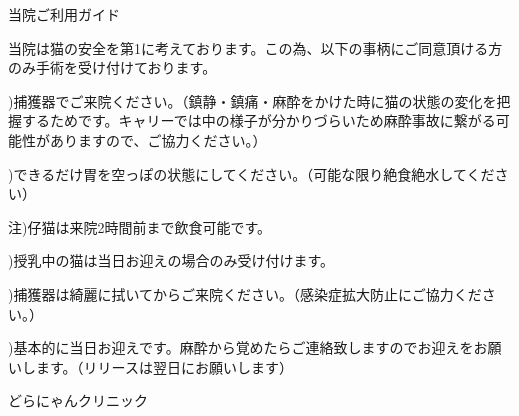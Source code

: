 \documentclass[b5paper]{jsarticle}
\begin{document}
\Huge

当院ご利用ガイド\vspace{10pt}

\Large

当院は猫の安全を第1に考えております。この為、以下の事柄にご同意頂ける方のみ手術を受け付けております。\vspace{20pt}


)捕獲器でご来院ください。（鎮静・鎮痛・麻酔をかけた時に猫の状態の変化を把握するためです。キャリーでは中の様子が分かりづらいため麻酔事故に繋がる可能性がありますので、ご協力ください。）\vspace{5pt}


)できるだけ胃を空っぽの状態にしてください。（可能な限り絶食絶水してください）\vspace{-2pt}

\begin{large}注)仔猫は来院2時間前まで飲食可能です。\end{large}\vspace{5pt}


)授乳中の猫は当日お迎えの場合のみ受け付けます。


)捕獲器は綺麗に拭いてからご来院ください。（感染症拡大防止にご協力ください。）\vspace{5pt}


)基本的に当日お迎えです。麻酔から覚めたらご連絡致しますのでお迎えをお願いします。（リリースは翌日にお願いします）


\vspace{25pt}
\flushright どらにゃんクリニック
\end{document}
